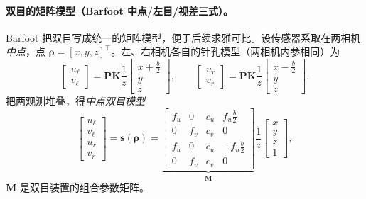 \paragraph{双目的矩阵模型（Barfoot 中点/左目/视差三式）。}
Barfoot\cite{barfoot2024state} 把双目写成统一的矩阵模型，便于后续求雅可比。设传感器系取在两相机\emph{中点}，点 $\boldsymbol\rho=[x,y,z]^\top$。左、右相机各自的针孔模型（两相机内参相同）为
\begin{equation}
  \begin{bmatrix}u_\ell\\v_\ell\end{bmatrix}=\mathbf{P}\mathbf{K}\frac1z\begin{bmatrix}x+\tfrac b2\\y\\z\end{bmatrix},\qquad
  \begin{bmatrix}u_r\\v_r\end{bmatrix}=\mathbf{P}\mathbf{K}\frac1z\begin{bmatrix}x-\tfrac b2\\y\\z\end{bmatrix}.
  \label{eq:stereo-lr}
\end{equation}
把两观测堆叠，得\emph{中点双目模型}
\begin{equation}
  \begin{bmatrix}u_\ell\\v_\ell\\u_r\\v_r\end{bmatrix}=\mathbf{s}(\boldsymbol\rho)
  =\underbrace{\begin{bmatrix}f_u&0&c_u&f_u\tfrac b2\\0&f_v&c_v&0\\f_u&0&c_u&-f_u\tfrac b2\\0&f_v&c_v&0\end{bmatrix}}_{\textstyle\mathbf{M}}
  \frac1z\begin{bmatrix}x\\y\\z\\1\end{bmatrix},
  \label{eq:stereo-M}
\end{equation}
$\mathbf{M}$ 是双目装置的组合参数矩阵。

